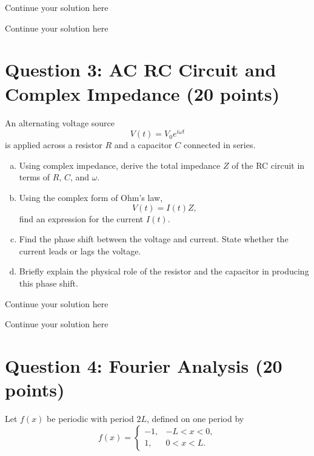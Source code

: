 \documentclass{article}
\begin{document}
\newpage
Continue your solution here
\vspace{4.0in}

\newpage

\newpage
Continue your solution here
\vspace{4.0in}

\newpage

\section*{Question 3: AC RC Circuit and Complex Impedance (20 points)}

An alternating voltage source
\[
V(t)=V_0 e^{i\omega t}
\]
is applied across a resistor \(R\) and a capacitor \(C\) connected in series.

\begin{enumerate}[a)]
\item Using complex impedance, derive the total impedance \(Z\) of the RC circuit in terms of \(R\), \(C\), and \(\omega\).

\item Using the complex form of Ohm's law,
\[
V(t)=I(t)Z,
\]
find an expression for the current \(I(t)\).

\item Find the phase shift between the voltage and current. State whether the current leads or lags the voltage.

\item Briefly explain the physical role of the resistor and the capacitor in producing this phase shift.
\end{enumerate}

\newpage
Continue your solution here
\vspace{4.0in}

\newpage

\newpage
Continue your solution here
\vspace{4.0in}

\newpage

\section*{Question 4: Fourier Analysis (20 points)}

Let \( f(x) \) be periodic with period \(2L\), defined on one period by
\[
f(x)=
\begin{cases}
-1, & -L<x<0,\\[6pt]
1, & 0<x<L.
\end{cases}
\]
\end{document}

